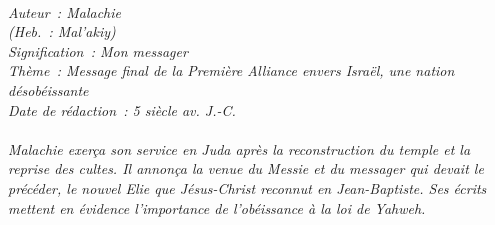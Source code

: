 \BFont
\noindent\hrulefill
{\footnotesize
\textit{
\bigskip
{\centering{}
\\Auteur~: Malachie
\\(Heb.~: Mal'akiy)
\\Signification~: Mon messager
\\Thème~: Message final de la Première Alliance envers Israël, une nation désobéissante
\\Date de rédaction~: 5 siècle av. J.-C.\\}
}
\textit{
\\Malachie exerça son service en Juda après la reconstruction du temple et la reprise des cultes. Il annonça la venue du Messie et du messager qui devait le précéder, le nouvel Elie que Jésus-Christ reconnut en Jean-Baptiste. Ses écrits mettent en évidence l'importance de l'obéissance à la loi de Yahweh.\bigskip
}
}
\par\nobreak\noindent\hrulefill
